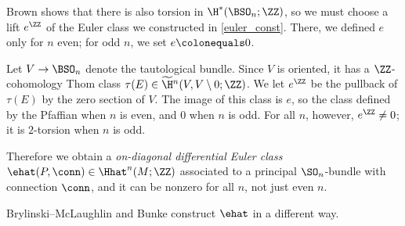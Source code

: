 \begin{example}
	Brown \cite[Theorem 1.6]{Bro82} shows that there is also torsion in $\H^*(\BSO_n; \ZZ)$, so we must
	choose a lift $e^\ZZ$ of the Euler class we constructed in \cref{euler_const}. There, we defined $e$ only for $n$
	even; for odd $n$, we set $e\colonequals 0$.

	Let $V\to\BSO_n$ denote the tautological bundle. Since $V$ is oriented, it has a $\ZZ$-cohomology
	Thom class $\tau(E)\in \widetilde{\H}{}^n(V, V\setminus 0; \ZZ)$. We let $e^\ZZ$ be the pullback of $\tau(E)$ by
	the zero section of $V$. The image of this class is $e$, so the class defined by the Pfaffian when $n$ is even, and
	$0$ when $n$ is odd. For all $n$, however, $e^\ZZ\ne 0$; it is $2$-torsion when $n$ is odd.

	Therefore we obtain a \emph{on-diagonal differential Euler class} $\ehat(P, \conn)\in\Hhat^n(M; \ZZ)$
	associated to a principal $\SO_n$-bundle with connection $\conn$, and it can be nonzero for all $n$, not just
	even $n$.

	Brylinski--McLaughlin \cite{BM96} and Bunke \cite[Example 3.85]{Bunke:notes} construct $\ehat$ in a different way.
\end{example}

